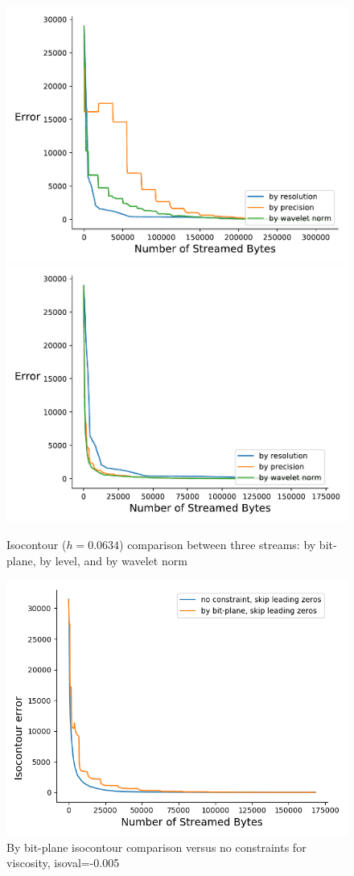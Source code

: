 \begin{figure}[htb!]
	\centering
	{\includegraphics[width=0.4\linewidth]{img/independent/normalized/isocontour-miranda-viscosity}}
	{\includegraphics[width=0.4\linewidth]{img/skip-zeros/isocontour-miranda-viscosity}}
	\caption {Isocontour ($h = 0.0634$) comparison between three streams: by bit-plane, by level, and by wavelet norm}
	\label{fig:isocontour_traditional_vs_by_norm_viscosity}
\end{figure}

\begin{figure}
  \centering
  \includegraphics[width=0.8\linewidth]{resources/isocontour-error-by-bit-plane-viscosity.png}
  \caption {By bit-plane isocontour comparison versus no constraints for viscosity, isoval=-0.005}
  \label{fig:by_bit_plane_isocontour}
\end{figure}
